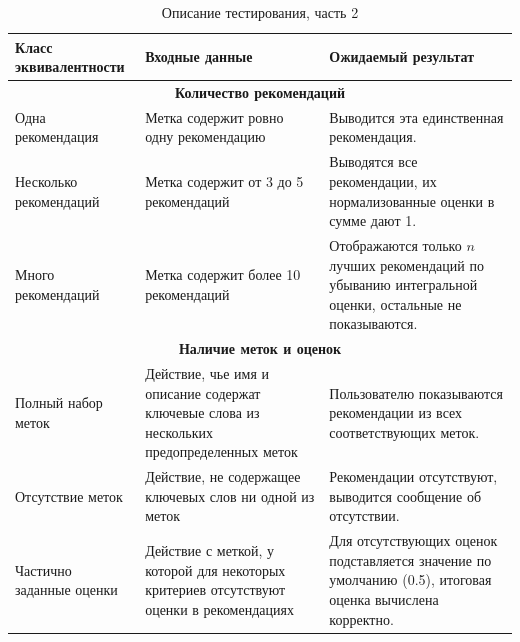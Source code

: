 \begin{table}[H]
\centering
\caption{Описание тестирования, часть 2}
\label{tab:tests2}
\begin{tabular}{|p{}|p{}|p{}|}
\hline
\textbf{Класс \newline эквивалентности} & \textbf{Входные данные} & \textbf{Ожидаемый \newline результат} \\
\hline
\multicolumn{3}{|c|}{\textbf{Количество рекомендаций}} \\
\hline
Одна \newline рекомендация & Метка содержит ровно одну рекомендацию & Выводится эта единственная рекомендация. \\
\hline
Несколько \newline рекомендаций & Метка содержит от 3 до 5 рекомендаций & Выводятся все рекомендации, их нормализованные оценки в сумме дают 1. \\
\hline
Много \newline рекомендаций & Метка содержит более 10 рекомендаций & Отображаются только $n$ лучших рекомендаций по убыванию интегральной оценки, остальные не показываются. \\
\hline
\multicolumn{3}{|c|}{\textbf{Наличие меток и оценок}} \\
\hline
Полный набор \newline меток & Действие, чье имя и описание содержат ключевые слова из нескольких предопределенных меток & Пользователю показываются рекомендации из всех соответствующих меток. \\
\hline
Отсутствие меток & Действие, не содержащее ключевых слов ни одной из меток & Рекомендации отсутствуют, выводится сообщение об отсутствии. \\
\hline
Частично \newline заданные оценки & Действие с меткой, у которой для некоторых критериев отсутствуют оценки в рекомендациях & Для отсутствующих оценок подставляется значение по умолчанию (0.5), итоговая оценка вычислена корректно. \\
\hline
\end{tabular}
\end{table}

